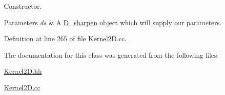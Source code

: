 Constructor. 


\begin{DoxyParams}{Parameters}
{\em ds} & A \hyperlink{class_photo_finish_1_1_d__sharpen}{D\+\_\+sharpen} object which will supply our parameters. \\
\hline
\end{DoxyParams}


Definition at line 265 of file Kernel2\+D.\+cc.



The documentation for this class was generated from the following files\+:\begin{DoxyCompactItemize}
\item 
\hyperlink{_kernel2_d_8hh}{Kernel2\+D.\+hh}\item 
\hyperlink{_kernel2_d_8cc}{Kernel2\+D.\+cc}\end{DoxyCompactItemize}
